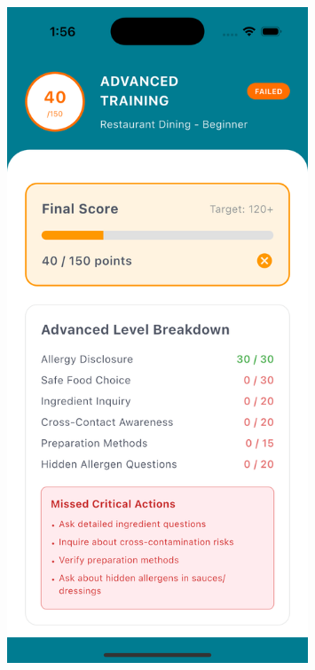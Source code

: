 \documentclass[MScCS]{uccthesis}
\begin{document}
\begin{figure}[htbp]
    \centering
    \begin{minipage}[b]{0.45\textwidth}
        \centering
        \includegraphics[width=0.8\textwidth,height=0.45\textheight,keepaspectratio]{Figures/resto_feedback_screen.png}
    \end{minipage}
    \hfill
    \begin{minipage}[b]{0.45\textwidth}
        \centering

\end{minipage}
\end{figure}
\end{document}
